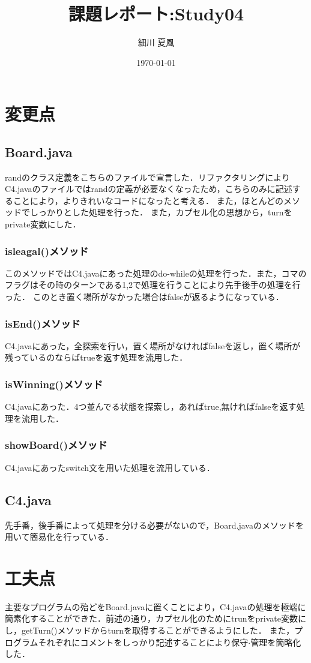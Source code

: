 \documentclass{jlreq}
\title{課題レポート:Study04}
\author{細川 夏風}
\date{\today}
\begin{document}
  \maketitle

  \section{変更点}
    \subsection{Board.java}
      randのクラス定義をこちらのファイルで宣言した．リファクタリングによりC4.javaのファイルではrandの定義が必要なくなったため，こちらのみに記述することにより，よりきれいなコードになったと考える．
      また，ほとんどのメソッドでしっかりとした処理を行った．
      また，カプセル化の思想から，turnをprivate変数にした．
      \subsubsection*{isleagal()メソッド}
        このメソッドではC4.javaにあった処理のdo-whileの処理を行った．また，コマのフラグはその時のターンである1,2で処理を行うことにより先手後手の処理を行った．
        このとき置く場所がなかった場合はfalseが返るようになっている．
      \subsubsection*{isEnd()メソッド}
        C4.javaにあった，全探索を行い，置く場所がなければfalseを返し，置く場所が残っているのならばtrueを返す処理を流用した．
      \subsubsection*{isWinning()メソッド}
        C4.javaにあった．4つ並んでる状態を探索し，あればtrue,無ければfalseを返す処理を流用した．
      \subsubsection*{showBoard()メソッド}
        C4.javaにあったswitch文を用いた処理を流用している．
    \subsection{C4.java}
      先手番，後手番によって処理を分ける必要がないので，Board.javaのメソッドを用いて簡易化を行っている．
  \section{工夫点}
    主要なプログラムの殆どをBoard.javaに置くことにより，C4.javaの処理を極端に簡素化することができた．前述の通り，カプセル化のためにtrunをprivate変数にし，getTurn()メソッドからturnを取得することができるようにした．
    また，プログラムそれぞれにコメントをしっかり記述することにより保守$\cdot$管理を簡略化した．
    
\begin{thebibliography}{99}
  
\end{thebibliography}
\end{document}
